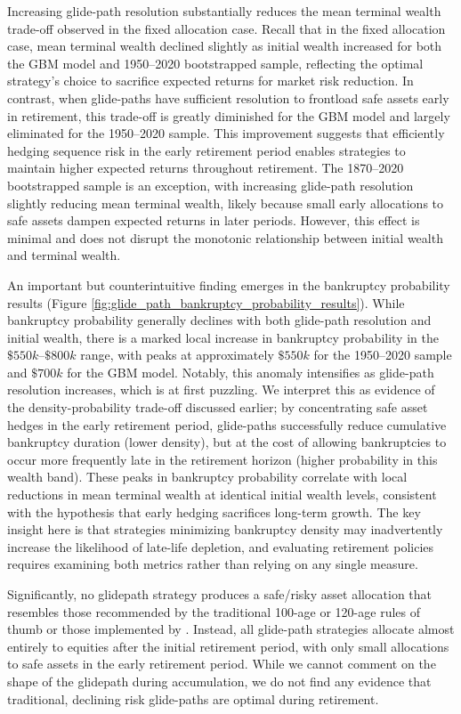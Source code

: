 \documentclass[11pt]{article}
\begin{document}
Increasing glide-path resolution substantially reduces the mean terminal wealth trade-off observed in the fixed allocation case. Recall that in the fixed allocation case, mean terminal wealth declined slightly as initial wealth increased for both the GBM model and 1950--2020 bootstrapped sample, reflecting the optimal strategy's choice to sacrifice expected returns for market risk reduction. In contrast, when glide-paths have sufficient resolution to frontload safe assets early in retirement, this trade-off is greatly diminished for the GBM model and largely eliminated for the 1950--2020 sample. This improvement suggests that efficiently hedging sequence risk in the early retirement period enables strategies to maintain higher expected returns throughout retirement. The 1870--2020 bootstrapped sample is an exception, with increasing glide-path resolution slightly reducing mean terminal wealth, likely because small early allocations to safe assets dampen expected returns in later periods. However, this effect is minimal and does not disrupt the monotonic relationship between initial wealth and terminal wealth.

An important but counterintuitive finding emerges in the bankruptcy probability results (Figure \ref{fig:glide_path_bankruptcy_probability_results}). While bankruptcy probability generally declines with both glide-path resolution and initial wealth, there is a marked local increase in bankruptcy probability in the $\$550k$--$\$800k$ range, with peaks at approximately $\$550k$ for the 1950--2020 sample and $\$700k$ for the GBM model. Notably, this anomaly intensifies as glide-path resolution increases, which is at first puzzling. We interpret this as evidence of the density-probability trade-off discussed earlier; by concentrating safe asset hedges in the early retirement period, glide-paths successfully reduce cumulative bankruptcy duration (lower density), but at the cost of allowing bankruptcies to occur more frequently late in the retirement horizon (higher probability in this wealth band). These peaks in bankruptcy probability correlate with local reductions in mean terminal wealth at identical initial wealth levels, consistent with the hypothesis that early hedging sacrifices long-term growth. The key insight here is that strategies minimizing bankruptcy density may inadvertently increase the likelihood of late-life depletion, and evaluating retirement policies requires examining both metrics rather than relying on any single measure. 

Significantly, no glidepath strategy produces a safe/risky asset allocation that resembles those recommended by the traditional 100-age or 120-age rules of thumb or those implemented by \textcite{superlife2026sipo}. Instead, all glide-path strategies allocate almost entirely to equities after the initial retirement period, with only small allocations to safe assets in the early retirement period. While we cannot comment on the shape of the glidepath during accumulation, we do not find any evidence that traditional, declining risk glide-paths are optimal during retirement. 
\end{document}
